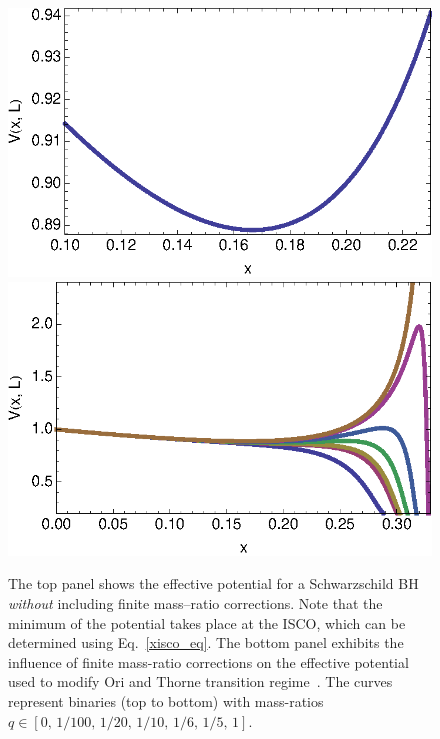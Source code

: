 \begin{figure}%
\includegraphics[height=0.6\textwidth,  clip]{figures/imrimri/pot_eta_limit.eps}
\includegraphics[height=0.6\textwidth,  clip]{figures/imrimri/mod_eff_pot.eps}
\caption{The top panel shows the effective potential for a Schwarzschild BH 
{\it without} including finite mass--ratio corrections. Note that the minimum
of the potential takes place at the ISCO, which can be determined using 
Eq.~\eqref{xisco_eq}.  The bottom panel exhibits the influence of finite 
mass-ratio corrections on the effective potential used to modify Ori and 
Thorne transition regime~\cite{amos}. The curves represent  binaries 
(top to bottom) with mass-ratios  
\(q \in [0,\, 1/100, \,1/20, \,1/10, \,1/6, \,1/5, \,1 ]\).}
\label{eff_pot_fig}
\end{figure}

